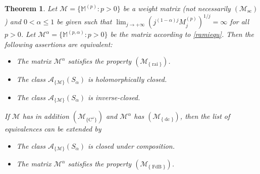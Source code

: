 \documentclass[11pt,a4paper]{article}
\theoremstyle{plain}
\newtheorem{theorem}[proposition]{Theorem}
\theoremstyle{definition}
\newcommand{\M}{\mathbb{M}}
\let\on=\operatorname
\begin{document}
\begin{theorem}\label{theorem1siddiqi}
	Let $\mathcal{M}=\{\M^{(p)}: p>0\}$ be a weight matrix (not necessarily \hyperlink{Msc}{$(\mathcal{M}_{\on{sc}})$}) and $0<\alpha\le 1$ be given such that $\lim_{j\rightarrow+\infty}(j^{(1-\alpha)j}M^{(p)}_j)^{1/j}=\infty$ for all $p>0$. Let $\mathcal{M}^{\alpha}=\{\M^{(p,\alpha)}: p>0\}$ be the matrix according to \eqref{ramiequ}. Then the following assertions are equivalent:
	\begin{itemize}
		\item[$(a)$] The matrix $\mathcal{M}^{\alpha}$ satisfies the property \hyperlink{R-rai}{$(\mathcal{M}_{\{\on{rai}\}})$}.
		
		\item[$(b)$] The class $\mathcal{A}_{\{\mathcal{M}\}}(S_{\alpha})$ is holomorphically closed.
		
		
		\item[$(c)$] The class $\mathcal{A}_{\{\mathcal{M}
			\}}(S_{\alpha})$ is inverse-closed.
		
	\end{itemize}
	If $\mathcal{M}$ has in addition \hyperlink{R-Comega}{$(\mathcal{M}_{\{\text{C}^{\omega}\}})$} and $\mathcal{M}^{\alpha}$ has \hyperlink{R-dc}{$(\mathcal{M}_{\{\on{dc}\}})$}, then the list of equivalences can be extended by

	\begin{itemize}
		\item[$(d)$] The class $\mathcal{A}_{\{\mathcal{M}\}}(S_{\alpha})$ is closed under composition.
		
		
		\item[$(e)$] The matrix $\mathcal{M}^{\alpha}$ satisfies the property \hyperlink{R-FdB}{$(\mathcal{M}_{\{\on{FdB}\}})$}.
	\end{itemize}
\end{theorem}
\end{document}
